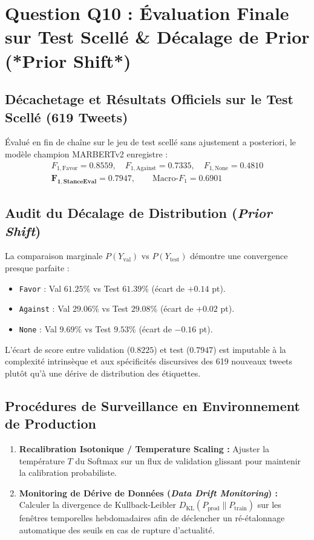 \documentclass[11pt,a4paper]{article}
\begin{document}
\section{Question Q10 : Évaluation Finale sur Test Scellé \& Décalage de Prior (*Prior Shift*)}

\subsection{Décachetage et Résultats Officiels sur le Test Scellé (619 Tweets)}
Évalué en fin de chaîne sur le jeu de test scellé sans ajustement a posteriori, le modèle champion MARBERTv2 enregistre :
\begin{align}
    F_{1,\text{Favor}} = \mathbf{0.8559}, \quad F_{1,\text{Against}} = \mathbf{0.7335}, \quad F_{1,\text{None}} = \mathbf{0.4810} \\
    \mathbf{F_{1,\text{StanceEval}} = \mathbf{0.7947}}, \qquad \text{Macro-}F_1 = \mathbf{0.6901}
\end{align}

\subsection{Audit du Décalage de Distribution (\textit{Prior Shift})}
La comparaison marginale $P(Y_{\text{val}})$ vs $P(Y_{\text{test}})$ démontre une convergence presque parfaite :
\begin{itemize}[noitemsep]
    \item \texttt{Favor} : Val $61.25\%$ vs Test $61.39\%$ (écart de $+0.14$ pt).
    \item \texttt{Against} : Val $29.06\%$ vs Test $29.08\%$ (écart de $+0.02$ pt).
    \item \texttt{None} : Val $9.69\%$ vs Test $9.53\%$ (écart de $-0.16$ pt).
\end{itemize}
L'écart de score entre validation ($0.8225$) et test ($0.7947$) est imputable à la complexité intrinsèque et aux spécificités discursives des 619 nouveaux tweets plutôt qu'à une dérive de distribution des étiquettes.

\subsection{Procédures de Surveillance en Environnement de Production}
\begin{enumerate}
    \item \textbf{Recalibration Isotonique / Temperature Scaling :} Ajuster la température $T$ du Softmax sur un flux de validation glissant pour maintenir la calibration probabiliste.
    \item \textbf{Monitoring de Dérive de Données (\textit{Data Drift Monitoring}) :} Calculer la divergence de Kullback-Leibler $D_{\text{KL}}(P_{\text{prod}} \parallel P_{\text{train}})$ sur les fenêtres temporelles hebdomadaires afin de déclencher un ré-étalonnage automatique des seuils en cas de rupture d'actualité.
\end{enumerate}
\end{document}
